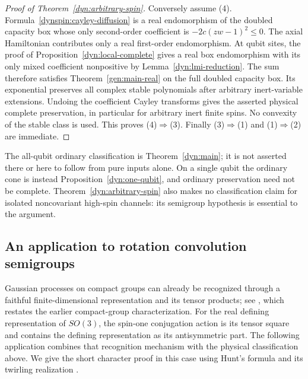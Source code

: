 \documentclass[reqno]{amsart}
\theoremstyle{definition}
\theoremstyle{remark}
\begin{document}
\begin{proof}[Proof of Theorem~\ref{dyn:arbitrary-spin}]
Conversely assume (4).  Formula~\eqref{dynspin:cayley-diffusion} is a
real endomorphism of the doubled capacity box whose only second-order
coefficient is $-2c(zw-1)^2\leq0$.  The axial Hamiltonian contributes
only a real first-order endomorphism.  At qubit sites, the proof of
Proposition~\ref{dyn:local-complete} gives a real box endomorphism with
its only mixed coefficient nonpositive by
Lemma~\ref{dyn:lmi-reduction}.  The sum therefore satisfies
Theorem~\ref{gen:main-real} on the full doubled capacity box.  Its
exponential preserves all complex stable polynomials after arbitrary
inert-variable extensions.  Undoing the coefficient Cayley transforms
gives the asserted physical complete preservation, in particular for
arbitrary inert finite spins.  No convexity of the stable class is used.
This proves (4)$\Rightarrow$(3).  Finally (3)$\Rightarrow$(1) and
(1)$\Rightarrow$(2) are immediate.
\end{proof}

The all-qubit ordinary classification is Theorem~\ref{dyn:main}; it is
not asserted there or here to follow from pure inputs alone.  On a single
qubit the ordinary cone is instead Proposition~\ref{dyn:one-qubit}, and
ordinary preservation need not be complete.  Theorem~\ref{dyn:arbitrary-spin}
also makes no classification claim for isolated noncovariant high-spin
channels: its semigroup hypothesis is essential to the argument.

\subsection{An application to rotation convolution semigroups}
\label{dynspin:brownian-subsection}

Gaussian processes on compact groups can already be recognized through
a faithful finite-dimensional representation and its tensor products;
see \cite[Theorem~2.8]{Voit03}, which restates the earlier compact-group
characterization.  For the real defining representation of $SO(3)$,
the spin-one conjugation action is its tensor square and contains the
defining representation as its antisymmetric part.  The following
application combines that recognition mechanism with the physical
classification above.  We give the short character proof in this case
using Hunt's formula \cite{Hunt56} and its twirling realization
\cite[Theorem~5.1]{Aniello10}.
\end{document}
